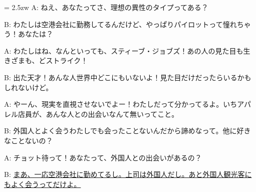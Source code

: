 \documentclass[11pt]{amsart}
\title{}
\author{}
\newenvironment{hangall}[1]{\hangindent = 2.5zw\everypar{\hangindent = 2.5zw}}{}
\begin{document}
\maketitle
\begin{hangall}{}%
A: ねえ、あなたってさ、理想の異性のタイプってある？

B: わたしは空港会社に勤務してるんだけど、やっぱりパイロットって憧れちゃう！あなたは？

A: わたしはね、なんといっても、スティーブ・ジョブズ！あの人の見た目も生きざまも、どストライク！

B: 出た天才！あんな人世界中どこにもいないよ！見た目だけだったらいるかもしれないけど。

A: やーん、現実を直視させないでよー！わたしだって分かってるよ。いちアパレル店員が、あんな人との出会いなんて無いってこと。

B: 外国人とよく会うわたしでも会ったことないんだから諦めなって。他に好きなことないの？

A: チョット待って！あなたって、外国人との出会いがあるの？

B: \ul{まあ、一応空港会社に勤めてるし。上司は外国人だし。あと外国人観光客にもよく会うってだけよ。}\end{hangall}
\end{document}
